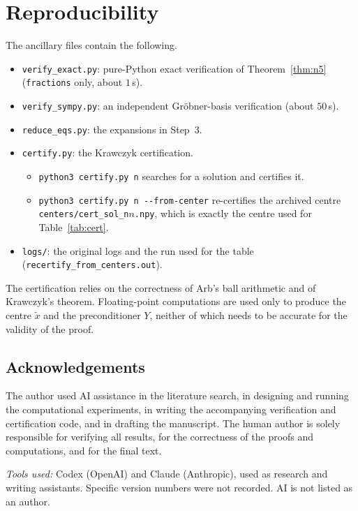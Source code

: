 \documentclass[11pt]{amsart}
\theoremstyle{definition}
\theoremstyle{remark}
\begin{document}
\section{Reproducibility}\label{sec:repro}
The ancillary files contain the following.
\begin{itemize}
\item \texttt{verify\_exact.py}: pure-Python exact verification of Theorem~\ref{thm:n5} (\texttt{fractions} only, about $1$\,s).
\item \texttt{verify\_sympy.py}: an independent Gr\"obner-basis verification (about $50$\,s).
\item \texttt{reduce\_eqs.py}: the expansions in Step~3.
\item \texttt{certify.py}: the Krawczyk certification.
\begin{itemize}
\item \texttt{python3 certify.py n} searches for a solution and certifies it.
\item \texttt{python3 certify.py n -{}-from-center} re-certifies the archived centre\\ \texttt{centers/cert\_sol\_n$n$.npy}, which is exactly the centre used for Table~\ref{tab:cert}.
\end{itemize}
\item \texttt{logs/}: the original logs and the run used for the table\\ (\texttt{recertify\_from\_centers.out}).
\end{itemize}
The certification relies on the correctness of Arb's ball arithmetic and of Krawczyk's theorem. Floating-point computations are used only to produce the centre $\tilde x$ and the preconditioner $Y$, neither of which needs to be accurate for the validity of the proof.

\subsection*{Acknowledgements}
The author used AI assistance in the literature search, in designing and running the computational experiments, in writing the accompanying verification and certification code, and in drafting the manuscript. The human author is solely responsible for verifying all results, for the correctness of the proofs and computations, and for the final text.

\noindent\textit{Tools used:} Codex (OpenAI) and Claude (Anthropic), used as research and writing assistants. Specific version numbers were not recorded. AI is not listed as an author.
\end{document}
